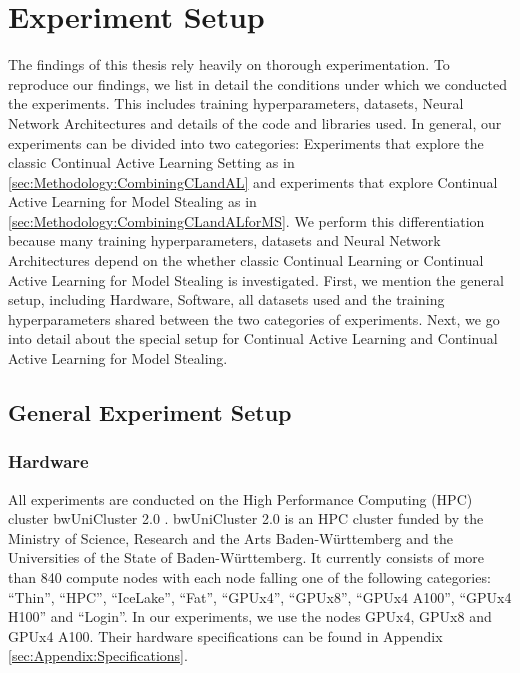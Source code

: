 
\chapter{Experiment Setup}
\label{ch:ExperimentSetup}
The findings of this thesis rely heavily on thorough experimentation. To reproduce our findings, we list in detail the
conditions under which we conducted the experiments. This includes training hyperparameters, datasets, Neural Network Architectures
and details of the code and libraries used. In general, our experiments can be divided into two categories: Experiments that explore
the classic Continual Active Learning Setting as in \ref{sec:Methodology:CombiningCLandAL} and experiments that explore Continual 
Active Learning for Model Stealing as in \ref{sec:Methodology:CombiningCLandALforMS}. We perform this differentiation because many 
training hyperparameters, datasets and Neural Network Architectures depend on the whether classic Continual Learning or Continual 
Active Learning for Model Stealing is investigated. First, we mention the general setup, including Hardware, Software, all datasets used
and the training hyperparameters shared between the two categories of experiments. Next, we go into detail about the special setup for
Continual Active Learning and Continual Active Learning for Model Stealing.

\section{General Experiment Setup}
\label{sec:ExperimentSetup:FirstSection}

\subsection{Hardware}
\label{sec:ExperimentSetup:Hardware}
All experiments are conducted on the High Performance Computing (HPC) cluster bwUniCluster 2.0 \cite{bwUnicluster}. bwUniCluster 2.0 is an HPC cluster
funded by the Ministry of Science, Research and the Arts Baden-Württemberg and the Universities of the State of Baden-Württemberg. It currently consists
of more than 840 compute nodes with each node falling one of the following categories: \enquote{Thin}, \enquote{HPC}, \enquote{IceLake}, \enquote{Fat},
\enquote{GPUx4}, \enquote{GPUx8}, \enquote{GPUx4 A100}, \enquote{GPUx4 H100} and \enquote{Login}. In our experiments, we use the nodes GPUx4, GPUx8 and
GPUx4 A100. Their hardware specifications can be found in Appendix \ref{sec:Appendix:Specifications}.

